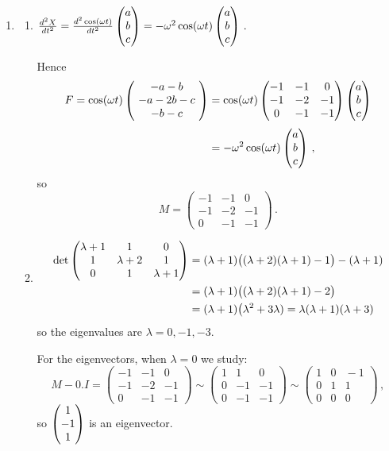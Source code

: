 \begin{enumerate}
\item 
\begin{enumerate}
\item $\frac{d^2 X}{dt^2}=\frac{d^2\cos(\omega t )}{dt^2}\begin{pmatrix} a\\b\\c \end{pmatrix}=-\omega^2\cos(\omega t) \begin{pmatrix} a\\b\\c \end{pmatrix}\, .$ 

Hence
\begin{align*}
F=\cos(\omega t) \left(\!\begin{array}{c} -a-b\\-a-2b-c\\-b-c \end{array}\!\right)
&=\cos(\omega t) \begin{pmatrix}-1&-1&0\\-1&-2&-1\\0&-1&-1\end{pmatrix}
\begin{pmatrix} a\\b\\c \end{pmatrix}\\[1mm]
&=-\omega^2\cos(\omega t) \begin{pmatrix} a\\b\\c \end{pmatrix}
\, ,
\end{align*}
so 
\[
M=\begin{pmatrix}-1&-1&0\\-1&-2&-1\\0&-1&-1\end{pmatrix}\, .
\]
\item
\begin{align*}
\det \begin{pmatrix}\lambda+1&\mc1&\mc0\\\mc1&\lambda+2&\mc1\\\mc0&\mc1&\lambda+1\end{pmatrix}
&=(\lambda+1)\big((\lambda+2)(\lambda+1)-1\big)-(\lambda+1)\\
&=(\lambda+1)\big((\lambda+2)(\lambda+1)-2\big)\\
&=(\lambda+1)\big(\lambda^2+3\lambda)=\lambda(\lambda+1)(\lambda+3)
\end{align*}
so the eigenvalues are $\lambda=0,-1 ,-3 $.

For the eigenvectors, when $\lambda=0$ we study:
\[
M-0.I=\begin{pmatrix}-1&-1&0\\-1&-2&-1\\0&-1&-1\end{pmatrix}\sim\begin{pmatrix}1&1&0\\0&-1&-1\\0&-1&-1\end{pmatrix}
\sim\begin{pmatrix}1&0&\!-1\\0&1&1\\0&0&0\end{pmatrix}\, ,
\]
so $\begin{pmatrix} 1\\-1\\1 \end{pmatrix}$ is an eigenvector.


\end{enumerate}
\end{enumerate}
